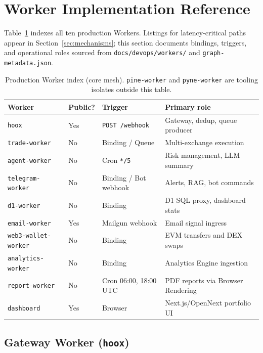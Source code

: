 \section{Worker Implementation Reference}
\label{sec:worker-deepdives}

Table~\ref{tab:worker-index} indexes all ten production Workers. Listings for latency-critical paths appear in Section~\ref{sec:mechanisms}; this section documents bindings, triggers, and operational roles sourced from \texttt{docs/devops/workers/} and \texttt{graph-metadata.json}.

\begin{table}[t]
  \centering
  \caption{Production Worker index (core mesh). \texttt{pine-worker} and \texttt{pyne-worker} are tooling isolates outside this table.}
  \label{tab:worker-index}
  \small
  \begin{tabular*}{\linewidth}{@{\extracolsep{\fill}}llll@{}}
    \toprule
    \textbf{Worker} & \textbf{Public?} & \textbf{Trigger} & \textbf{Primary role} \\
    \midrule
    \texttt{hoox} & Yes & \texttt{POST /webhook} & Gateway, dedup, queue producer \\
    \texttt{trade-worker} & No & Binding / Queue & Multi-exchange execution \\
    \texttt{agent-worker} & No & Cron \texttt{*/5} & Risk management, LLM summary \\
    \texttt{telegram-worker} & No & Binding / Bot webhook & Alerts, RAG, bot commands \\
    \texttt{d1-worker} & No & Binding & D1 SQL proxy, dashboard stats \\
    \texttt{email-worker} & Yes & Mailgun webhook & Email signal ingress \\
    \texttt{web3-wallet-worker} & No & Binding & EVM transfers and DEX swaps \\
    \texttt{analytics-worker} & No & Binding & Analytics Engine ingestion \\
    \texttt{report-worker} & No & Cron 06:00, 18:00 UTC & PDF reports via Browser Rendering \\
    \texttt{dashboard} & Yes & Browser & Next.js/OpenNext portfolio UI \\
    \bottomrule
  \end{tabular*}
\end{table}

\subsection{Gateway Worker (\texttt{hoox})}

